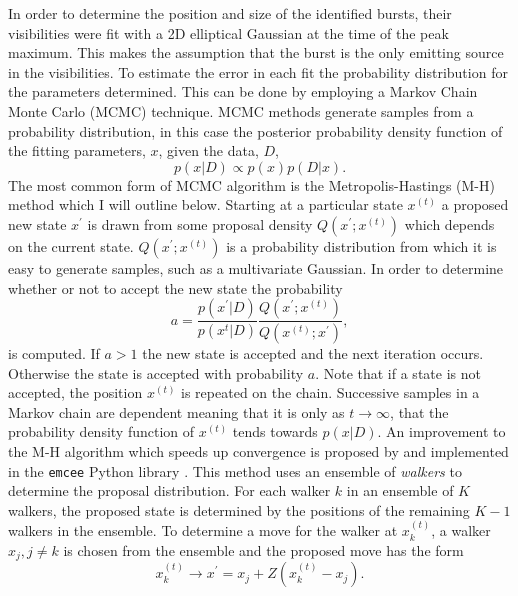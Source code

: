 In order to determine the position and size of the identified bursts, their visibilities were fit with a 2D elliptical Gaussian at the time of the peak maximum. This makes the assumption that the burst is the only emitting source in the visibilities.
To estimate the error in each fit the probability distribution for the parameters determined. This can be done by employing a Markov Chain Monte Carlo (MCMC) technique. MCMC methods generate samples from a probability distribution, in this case the posterior probability density function of the fitting parameters, $x$, given the data, $D$,
\begin{equation}
\label{eq:pdf}
p(x \vert D) \propto p(x)p(D \vert x).
\end{equation}	
The most common form of MCMC algorithm is the Metropolis-Hastings (M-H) method which I will outline below. Starting at a particular state $x^{(t)}$ a proposed new state $x^\prime$ is drawn from some proposal density $Q(x^\prime;x^{(t)})$ which depends on the current state. $Q(x^\prime;x^{(t)})$ is a probability distribution from which it is easy to generate samples, such as a multivariate Gaussian. In order to determine whether or not to accept the new state the probability
\begin{equation}
\label{eq:MHnewstate}
a = \frac{p(x^\prime \vert D)}{p(x^{t} \vert D)} \frac{Q(x^\prime;x^{(t)})}{Q(x^{(t)};x^\prime)},
\end{equation}
is computed. If $a > 1$ the new state is accepted and the next iteration occurs. Otherwise the state is accepted with probability $a$. Note that if a state is not accepted, the position $x^{(t)}$ is repeated on the chain. Successive samples in a Markov chain are dependent meaning that it is only as $t \rightarrow \infty$, that the probability density function of $x^{(t)}$ tends towards $p(x \vert D)$. An improvement to the M-H algorithm which speeds up convergence is proposed by \cite{Goodman2010} and implemented in the \texttt{emcee} Python library \citep{Foreman-Mackey2012}. This method uses an ensemble of \textit{walkers} to determine the proposal distribution. For each walker $k$ in an ensemble of $K$ walkers, the proposed state is determined by the positions of the remaining $K-1$ walkers in the ensemble. To determine a move for the walker at $x_k^{(t)}$, a walker $x_j, j \neq k$ is chosen from the ensemble and the proposed move has the form
\begin{equation}
\label{eq:MCMC_walkers}
x_k^{(t)} \rightarrow x^\prime = x_j + Z(x_k^{(t)} - x_j).
\end{equation}
